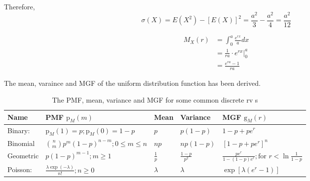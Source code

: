 \documentclass[UTF8]{article}
\begin{document}
\begin{enumerate}
            Therefore, 
            \begin{equation*}
                \sigma(X)=E(X^2)-[E(X)]^2=\frac{a^2}{3}-\frac{a^2}{4}=\frac{a^2}{12}
            \end{equation*}
            
            \begin{equation*}
                \begin{split}
                    M_X(r)&=\int^a_0\frac{e^{rx}}{a}dx\\
                    &=\frac{1}{ra}\cdot e^{rx}\big|^a_0\\
                    &=\frac{e^{ra}-1}{ra}
                \end{split}
            \end{equation*}

            The mean, varaince and MGF of the uniform distribution function has been derived.
    \end{enumerate}

    \begin{table}[h]
        \centering
        \caption{The PMF, mean, variance and MGF for some common discrete rv s}
        \begin{spacing}{2.0}
            \begin{tabular}{lllll}
                \hline
                Name & PMF $\text{p}_M(m)$ & Mean & Variance & MGF $\text{g}_M(r)$\\
                \hline
                Binary: & $\text{p}_M(1)=p;\text{p}_M(0)=1-p$ & $p$ & $p(1-p)$ & $1-p+pe^r$\\
                Binomial & $\binom{n}{m}p^m(1-p)^{n-m};0\leq m\leq n$ & $np$ & $np(1-p)$ & $[1-p+pe^r]^n$\\
                Geometric & $p(1-p)^{m-1};m\geq1$ & $\frac{1}{p}$ & $\frac{1-p}{p^2}$ & $\frac{pe^r}{1-(1-p)e^r};\text{for }r<\ln\frac{1}{1-p}$\\
                Poisson: & $\frac{\lambda\exp(-\lambda)}{n!};n\geq0$ & $\lambda$ & $\lambda$ & $\exp[\lambda(e^r-1)]$\\
                \hline           
            \end{tabular}
        \end{spacing}
    \end{table}
\end{document}
